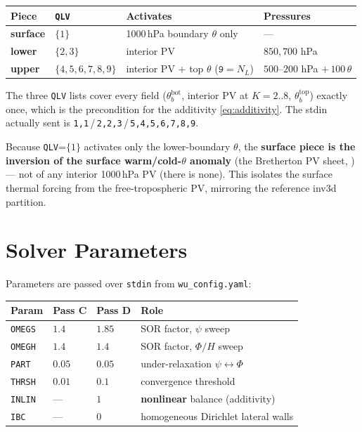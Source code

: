 \begin{center}\small
\begin{tabular}{llll}
  \toprule
  Piece & \texttt{QLV} & Activates & Pressures \\
  \midrule
  \textbf{surface} & $\{1\}$              & 1000\,hPa boundary $\theta$ only & --- \\
  \textbf{lower}   & $\{2,3\}$            & interior PV & $850,700$ hPa \\
  \textbf{upper}   & $\{4,5,6,7,8,9\}$    & interior PV $+$ top $\theta$ ($\texttt{9}{=}N_L$) & $500$--$200$ hPa $+\,100\,\theta$ \\
  \bottomrule
\end{tabular}
\end{center}

The three \texttt{QLV} lists cover every field
($\theta_b^{\text{bot}}$, interior PV at $K{=}2..8$, $\theta_b^{\text{top}}$)
exactly once, which is the precondition for the additivity
\cref{eq:additivity}.  The stdin actually sent is
\texttt{1,1}\,/\,\texttt{2,2,3}\,/\,\texttt{5,4,5,6,7,8,9}.

\begin{keybox}
Because \texttt{QLV}=$\{1\}$ activates only the lower-boundary $\theta$,
the \textbf{surface piece is the inversion of the surface
warm/cold-$\theta$ anomaly} (the Bretherton PV sheet,
) --- not of any interior 1000\,hPa PV (there is
none).  This isolates the surface thermal forcing from the
free-tropospheric PV, mirroring the reference inv3d partition.
\end{keybox}

\section{Solver Parameters}
\label{sec:wu_params}

Parameters are passed over \texttt{stdin} from \texttt{wu\_config.yaml}:

\begin{center}\small
\begin{tabular}{llll}
  \toprule
  Param & Pass C & Pass D & Role \\
  \midrule
  \texttt{OMEGS} & $1.4$  & $1.85$ & SOR factor, $\psi$ sweep \\
  \texttt{OMEGH} & $1.4$  & $1.4$  & SOR factor, $\Phi/H$ sweep \\
  \texttt{PART}  & $0.05$ & $0.05$ & under-relaxation $\psi\!\leftrightarrow\!\Phi$ \\
  \texttt{THRSH} & $0.01$ & $0.1$  & convergence threshold \\
  \texttt{INLIN} & ---    & $1$    & \textbf{nonlinear} balance (additivity) \\
  \texttt{IBC}   & ---    & $0$    & homogeneous Dirichlet lateral walls \\
  \bottomrule
\end{tabular}
\end{center}

